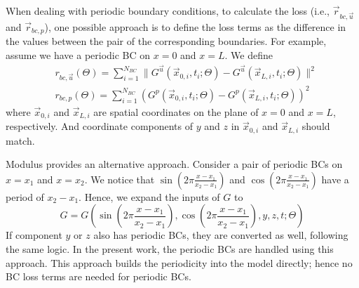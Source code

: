 
When dealing with periodic boundary conditions, to calculate the loss (i.e., $\vec{r}_{bc,\vec{u}}$ and $\vec{r}_{bc, p}$), one possible approach is to define the loss terms as the difference in the values between the pair of the corresponding boundaries.
For example, assume we have a periodic BC on $x=0$ and $x=L$.
We define
\begin{equation}\label{eq:naive-periodic-bc}
    \begin{aligned}
    &r_{bc,\vec{u}}(\Theta) = \sum\limits_{i=1}^{N_{BC}} \lVert G^{\vec{u}}(\vec{x}_{0,i}, t_i; \Theta) - G^{\vec{u}}(\vec{x}_{L,i}, t_i; \Theta) \rVert^2\\
    &r_{bc,p}(\Theta) = \sum\limits_{i=1}^{N_{BC}} ( G^{p}(\vec{x}_{0,i}, t_i; \Theta) - G^{p}(\vec{x}_{L,i}, t_i; \Theta) )^2
    \end{aligned}
\end{equation}
where $\vec{x}_{0,i}$ and $\vec{x}_{L,i}$ are spatial coordinates on the plane of $x=0$ and $x=L$, respectively.
And coordinate components of $y$ and $z$ in $\vec{x}_{0,i}$ and $\vec{x}_{L,i}$ should match.

Modulus provides an alternative approach.
Consider a pair of periodic BCs on $x=x_1$ and $x=x_2$.
We notice that $\sin(2\pi\frac{x-x_1}{x_2-x_1})$ and  $\cos(2\pi\frac{x-x_1}{x_2-x_1})$ have a period of $x_2-x_1$.
Hence, we expand the inputs of $G$ to
\begin{equation}\label{eq:periodic-G}
    G = G(\sin(2\pi\frac{x-x_1}{x_2-x_1}), \cos(2\pi\frac{x-x_1}{x_2-x_1}), y, z, t; \Theta)
\end{equation}
If component $y$ or $z$ also has periodic BCs, they are converted as well, following the same logic.
In the present work, the periodic BCs are handled using this approach.
This approach builds the periodicity into the model directly; hence no BC loss terms are needed for periodic BCs.
